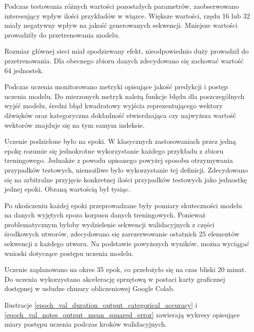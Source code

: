 {{        \bigskip

        Podczas testowania różnych wartości pozostałych parametrów, zaobserwowano interesujący wpływ ilości przykładów w wiązce.
        Większe wartości, rzędu 16 lub 32 miały negatywny wpływ na jakość generowanych sekwencji. 
        Mniejsze wartości prowadziły do przetrenowania modelu.

        Rozmiar głównej sieci miał spodziewany efekt, nieodpowiednio duży prowadził do przetrenowania. Dla obecnego
        zbioru danych zdecydowano się zachować wartość 64 jednostek.

        \bigskip

        Podczas uczenia monitorowano metryki opisujące jakość predykcji i postęp uczenia modelu.
        Do mierzonych metryk należą funkcje błędu dla poszczególnych wyjść modelu, średni błąd kwadratowy
        wyjścia reprezentującego wektory dźwięków oraz kategoryczna dokładność stwierdzająca czy najwyższa wartość
        wektorów znajduje się na tym samym indeksie.
        
        Uczenie podzielone było na epoki. W klasycznych zastosowaniach przez jedną epokę rozumie się jednokrotne
        wykorzystanie każdego przykładu z zbioru treningowego. Jednakże z powodu opisanego powyżej sposobu otrzymywania
        przypadków testowych, niemożliwe było wykorzystanie tej definicji. Zdecydowano się na arbitralne przyjęcie konkretnej 
        ilości przypadków testowych jako jednostkę jednej epoki. Obraną wartością był tysiąc.

        Po ukończeniu każdej epoki przeprowadzane były pomiary skuteczności modelu na danych wyjętych spoza korpusu 
        danych treningowych. Ponieważ problematycznym byłoby wydzielenie sekwencji walidacyjnych z części środkowych
        utworów, zdecydowano się zarezerwowanie ostatnich 25 elementów sekwencji z każdego utworu.
        Na podstawie powyższych wyników, można wyciągać wnioski dotyczące postępu uczenia modelu.

        Uczenie zaplanowano na okres 35 epok, co przełożyło się na czas bliski 20 minut. Do uczenia wykorzystano
        akcelerację sprzętową w postaci karty graficznej dostępnej w usłudze chmury obliczeniowej Google Colab.

        Ilustracje \ref{epoch_val_duration_output_categorical_accuracy} i \ref{epoch_val_notes_output_mean_squared_error} zawierają wykresy opisujące miary postępu uczenia podczas kroków walidacyjnych.

}}
